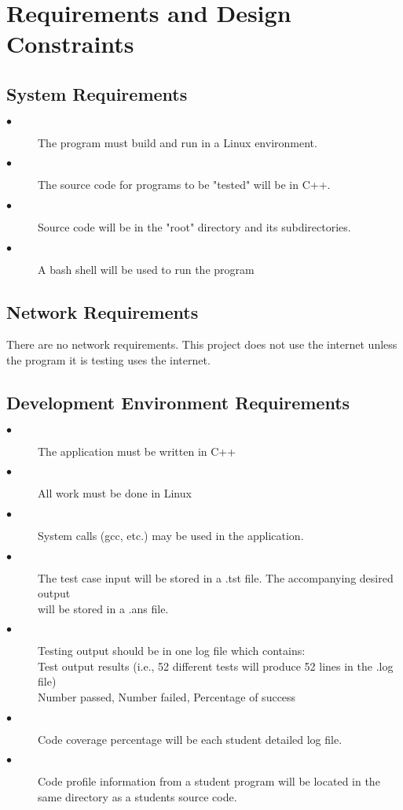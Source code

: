 \section{Requirements and Design Constraints}

\subsection{System  Requirements}
\begin{description}
\item [$\bullet$] The program must build and run in a Linux environment.
\item [$\bullet$] The source code for programs to be "tested" will be in C++.
\item [$\bullet$] Source code will be in the "root" directory and its subdirectories.
\item [$\bullet$] A bash shell will be used to run the program
\end{description}

\subsection{Network Requirements}
There are no network requirements. This project does not use the internet unless the program it is 
testing uses the internet.


\subsection{Development Environment Requirements}
\begin{description}
\item [$\bullet$] The application must be written in C++
\item [$\bullet$] All work must be done in Linux
\item [$\bullet$] System calls (gcc, etc.) may be used in the application.
\item [$\bullet$] The test case input will be stored in a .tst file. The accompanying
 desired output \\ will be stored in a .ans file.
\item [$\bullet$] Testing output should be in one log file which contains: \\
\hspace{4ex} Test output results (i.e., 52 different tests will produce 52 lines in the .log file) \\
\hspace{4ex} Number passed, Number failed, Percentage of success
\item[$\bullet$] Code coverage percentage  will be each student detailed log file.
\item[$\bullet$] Code profile information from a student program will be located in the same directory as a students source code.
\end{description}

